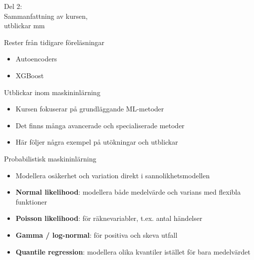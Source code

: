 \documentclass[10pt,english]{beamer}
\begin{document}
\begin{frame}[standout]
    \LARGE Del 2: \\ Sammanfattning av kursen, \\ utblickar mm
\end{frame}


\begin{frame}{Rester från tidigare föreläsningar}
\begin{itemize}
    \item Autoencoders
    \item XGBoost
\end{itemize}
\end{frame}

\begin{frame}{Utblickar inom maskininlärning}
  \begin{itemize}
    \item Kursen fokuserar på grundläggande ML-metoder
    \item Det finns många avancerade och specialiserade metoder
    \item Här följer några exempel på utökningar och utblickar
  \end{itemize}
\end{frame}

\begin{frame}{Probabilistisk maskininlärning}
  \begin{itemize}
    \item Modellera osäkerhet och variation direkt i sannolikhetsmodellen
    \item \textbf{Normal likelihood}: modellera både medelvärde och varians med flexibla funktioner
    \item \textbf{Poisson likelihood}: för räknevariabler, t.ex. antal händelser
    \item \textbf{Gamma / log-normal}: för positiva och skeva utfall
    \item \textbf{Quantile regression}: modellera olika kvantiler istället för bara medelvärdet
  \end{itemize}
\end{frame}
\end{document}
